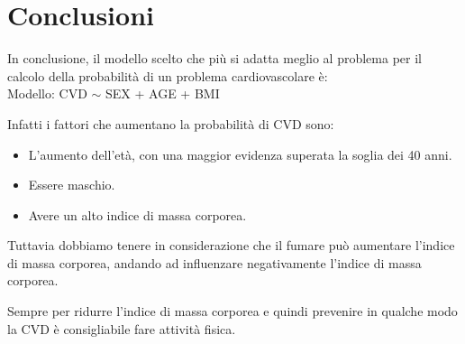 \documentclass{article}\usepackage[]{graphicx}\usepackage[]{xcolor}
\begin{document}
\section{Conclusioni}
  In conclusione, il modello scelto che più si adatta meglio al problema per il 
  calcolo della probabilità di un problema cardiovascolare è:\\
  Modello: CVD $\sim$ SEX + AGE + BMI \par
  Infatti i fattori che aumentano la probabilità di CVD sono:
  \begin{itemize}
    \item L'aumento dell'età, con una maggior evidenza superata la soglia dei 40 anni.
    \item Essere maschio.
    \item Avere un alto indice di massa corporea.
  \end{itemize}
  Tuttavia dobbiamo tenere in considerazione che il fumare può aumentare l'indice
  di massa corporea, andando ad influenzare negativamente l'indice di massa 
  corporea. \par
  Sempre per ridurre l'indice di massa corporea e quindi prevenire in qualche 
  modo la CVD è consigliabile fare attività fisica.
  
\end{document}
